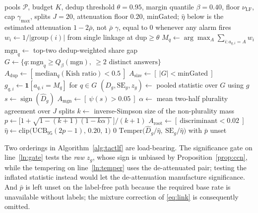 \documentclass[conference]{IEEEtran}
\newcommand{\Dhat}{\widehat{D}}
\newcommand{\sign}{\operatorname{sign}}
\newcommand{\SC}{\textsc{sc}}
\newcommand{\TACT}{\textsc{tact}}
\begin{document}
\hypertarget{alg:tactlf}{\,}\hypertarget{ln:gate}{\,}\hypertarget{ln:temper}{\,}
\begin{algorithm}[t]
\caption{\TACT-LF: recovering the sign without labels}

\begin{algorithmic}[1]
\Require pools $\mathcal{P}$, budget $K$, dedup threshold $\theta{=}0.95$,
margin quantile $\beta{=}0.40$, floor $\nu_{\mathrm{LF}}$, cap $\gamma_{\max}$,
splits $J{=}20$, attenuation floor $0.20$, $\mathrm{minGated}$; $\hat\eta$ below is the
estimated attenuation $1-2\bar\rho$, not $\bar\rho$
\Ensure $\gamma$, equal to $0$ whenever any alarm fires
  \State $w_i\gets 1/|\text{group}(i)|$ from single linkage at $\mathrm{dup}\ge\theta$
  \State $M_q\gets\arg\max_A\sum_{i:a_{q,i}=A}w_i$ 
  \State $\mathrm{mgn}_q\gets$ top-two dedup-weighted share gap
\EndFor
\State $G\gets\{q:\mathrm{mgn}_q\ge Q_\beta(\mathrm{mgn}),\ \text{$\ge 2$ distinct answers}\}$
\State $A_{\mathrm{dup}}\gets[\ \mathrm{median}_q(\text{Kish ratio})<0.5\ ]$ 
\State $A_{\mathrm{size}}\gets[\ |G|<\mathrm{minGated}\ ]$
\State $g_{q,i}\gets\mathbf{1}[a_{q,i}=M_q]$ for $q\in G$
\State $(\Dhat_g,\mathrm{SE}_g,z_g)\gets$ pooled statistic over $G$ using $g$
\State $s\gets\sign(\Dhat_g)$ 
\State $A_{\mathrm{mgn}}\gets[\ \psi(s)>0.05\ ]$ 
\State $\alpha\gets$ mean two-half plurality agreement over $J$ splits
\State $k\gets$ inverse-Simpson size of the non-plurality mass
\State $p\gets\big[1+\sqrt{1-(k{+}1)(1-k\alpha)}\,\big]/(k{+}1)$
\State $A_{\mathrm{root}}\gets[\ \text{discriminant}<0.02\ ]$ 
\State $\hat\eta\gets\mathrm{clip}\big(\mathrm{UCB}_{95}(2p-1),\,0.20,\,1\big)$
  \State \Return $0$ \Comment{refuse; the vote stays \SC}
\EndIf
\State \Return $\mathrm{Temper}\big(\Dhat_g/\hat\eta,\ \mathrm{SE}_g/\hat\eta\big)$ with $\bar p$ unset 
\end{algorithmic}
\end{algorithm}

Two orderings in Algorithm~\ref{alg:tactlf} are load-bearing. The significance
gate on line~\ref{ln:gate} tests the \emph{raw} $z_g$, whose sign is unbiased by
Proposition~\ref{prop:ccn}, while the tempering on line~\ref{ln:temper} uses
the de-attenuated pair; testing the inflated statistic instead would let the
de-attenuation manufacture significance. And $\bar p$ is left unset on the
label-free path because the required base rate is unavailable without labels;
the mixture correction of \eqref{eq:link} is consequently omitted.
\end{document}
